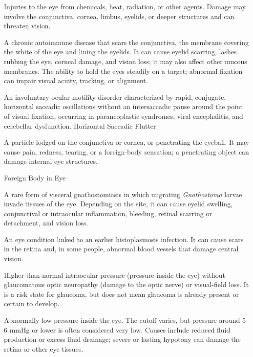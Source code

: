  Injuries to the eye from chemicals, heat, radiation, or other agents. Damage may involve the conjunctiva, cornea, limbus, eyelids, or deeper structures and can threaten vision.

 A chronic autoimmune disease that scars the conjunctiva, the membrane covering the white of the eye and lining the eyelids. It can cause eyelid scarring, lashes rubbing the eye, corneal damage, and vision loss; it may also affect other mucous membranes.
 The ability to hold the eyes steadily on a target; abnormal fixation can impair visual acuity, tracking, or alignment.

 An involuntary ocular motility disorder characterized by rapid, conjugate, horizontal saccadic oscillations without an intersaccadic pause around the point of visual fixation, occurring in paraneoplastic syndromes, viral encephalitis, and cerebellar dysfunction.
\synonyms
Horizontal Saccadic Flutter

 A particle lodged on the conjunctiva or cornea, or penetrating the eyeball. It may cause pain, redness, tearing, or a foreign-body sensation; a penetrating object can damage internal eye structures.

\synonyms
Foreign Body in Eye

 A rare form of visceral gnathostomiasis in which migrating \textit{Gnathostoma} larvae invade tissues of the eye. Depending on the site, it can cause eyelid swelling, conjunctival or intraocular inflammation, bleeding, retinal scarring or detachment, and vision loss.

 An eye condition linked to an earlier histoplasmosis infection. It can cause scars in the retina and, in some people, abnormal blood vessels that damage central vision.

 Higher-than-normal intraocular pressure (pressure inside the eye) without glaucomatous optic neuropathy (damage to the optic nerve) or visual-field loss. It is a risk state for glaucoma, but does not mean glaucoma is already present or certain to develop.

 Abnormally low pressure inside the eye. The cutoff varies, but pressure around 5–6 mmHg or lower is often considered very low. Causes include reduced fluid production or excess fluid drainage; severe or lasting hypotony can damage the retina or other eye tissues.

